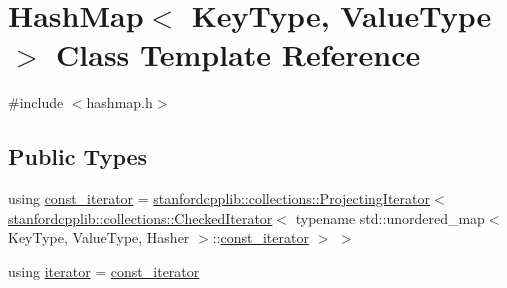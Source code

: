 \hypertarget{classHashMap}{}\section{Hash\+Map$<$ Key\+Type, Value\+Type $>$ Class Template Reference}
\label{classHashMap}


{\ttfamily \#include $<$hashmap.\+h$>$}

\subsection*{Public Types}
\begin{DoxyCompactItemize}
\item 
using \mbox{\hyperlink{classHashMap_a914487582193dbbeb2879c06f9671636}{const\+\_\+iterator}} = \mbox{\hyperlink{classstanfordcpplib_1_1collections_1_1ProjectingIterator}{stanfordcpplib\+::collections\+::\+Projecting\+Iterator}}$<$ \mbox{\hyperlink{classstanfordcpplib_1_1collections_1_1CheckedIterator}{stanfordcpplib\+::collections\+::\+Checked\+Iterator}}$<$ typename std\+::unordered\+\_\+map$<$ Key\+Type, Value\+Type, Hasher $>$\+::\mbox{\hyperlink{classHashMap_a914487582193dbbeb2879c06f9671636}{const\+\_\+iterator}} $>$ $>$
\item 
using \mbox{\hyperlink{classHashMap_ab3d10e70baaeac78e76b7abae7e2cf76}{iterator}} = \mbox{\hyperlink{classHashMap_a914487582193dbbeb2879c06f9671636}{const\+\_\+iterator}}
\end{DoxyCompactItemize}
